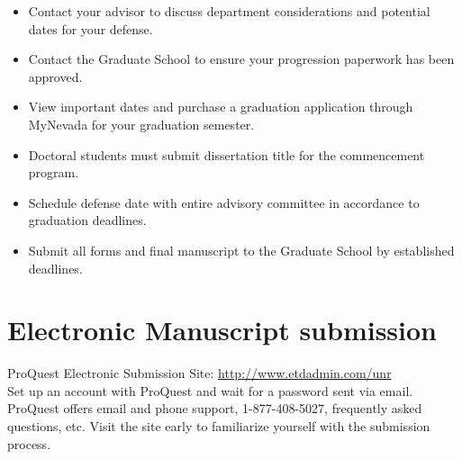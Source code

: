 \begin{itemize}
    \item Contact your advisor to discuss department considerations and potential dates for your defense.
    \item Contact the Graduate School to ensure your progression paperwork has been approved.
    \item View important dates and purchase a graduation application through MyNevada for your graduation semester.
    \item Doctoral students must submit dissertation title for the commencement program.
    \item Schedule defense date with entire advisory committee in accordance to graduation deadlines.
    \item Submit all forms and final manuscript to the Graduate School by established deadlines.
\end{itemize}

\section{Electronic Manuscript submission}
ProQuest Electronic Submission Site: \href{http://www.etdadmin.com/unr}{http://www.etdadmin.com/unr}\\

Set up an account with ProQuest and wait for a password sent via email. ProQuest offers email and phone support, 1-877-408-5027, frequently asked questions, etc. Visit the site early to familiarize yourself with the submission process.

